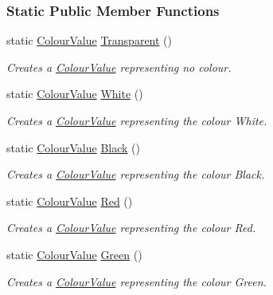 \subsubsection*{Static Public Member Functions}
\begin{DoxyCompactItemize}
\item 
static \hyperlink{classphys_1_1ColourValue}{ColourValue} \hyperlink{classphys_1_1ColourValue_ac54c32635131885b41a09fc2cec33d47}{Transparent} ()
\begin{DoxyCompactList}\small\item\em Creates a \hyperlink{classphys_1_1ColourValue}{ColourValue} representing no colour. \item\end{DoxyCompactList}\item 
static \hyperlink{classphys_1_1ColourValue}{ColourValue} \hyperlink{classphys_1_1ColourValue_ad6bcb6ff4ec09fbc02282cd324d3856b}{White} ()
\begin{DoxyCompactList}\small\item\em Creates a \hyperlink{classphys_1_1ColourValue}{ColourValue} representing the colour White. \item\end{DoxyCompactList}\item 
static \hyperlink{classphys_1_1ColourValue}{ColourValue} \hyperlink{classphys_1_1ColourValue_af9d049a7150ae445338410952ae41448}{Black} ()
\begin{DoxyCompactList}\small\item\em Creates a \hyperlink{classphys_1_1ColourValue}{ColourValue} representing the colour Black. \item\end{DoxyCompactList}\item 
static \hyperlink{classphys_1_1ColourValue}{ColourValue} \hyperlink{classphys_1_1ColourValue_a3c379d7dfd72c1c77b78701b86ea3ffd}{Red} ()
\begin{DoxyCompactList}\small\item\em Creates a \hyperlink{classphys_1_1ColourValue}{ColourValue} representing the colour Red. \item\end{DoxyCompactList}\item 
static \hyperlink{classphys_1_1ColourValue}{ColourValue} \hyperlink{classphys_1_1ColourValue_a6b6cb20e01c6d3b66165bc773650d9dd}{Green} ()
\begin{DoxyCompactList}\small\item\em Creates a \hyperlink{classphys_1_1ColourValue}{ColourValue} representing the colour Green. \item\end{DoxyCompactList}\item 

\end{DoxyCompactItemize}

